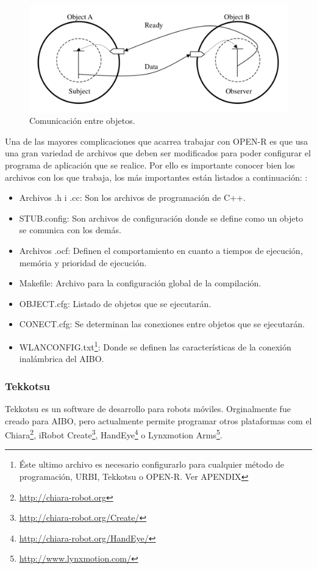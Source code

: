 \documentclass[12pt,a4paper,final,twoside]{book}
\begin{document}
\begin{figure}[h!]
	\centering
    \includegraphics[scale=0.5]{images/ObjectCom.pdf}
	 \caption{Comunicación entre objetos.}
  \label{fig:objectcom}
\end{figure}

Una de las mayores complicaciones que acarrea trabajar con OPEN-R es que usa una gran variedad de archivos que deben ser modificados para poder configurar el programa de aplicación que se realice. Por ello es importante conocer bien los archivos con los que trabaja, los más importantes están listados a continuación: 
:
\begin{itemize}
\item Archivos .h i .cc: Son los archivos de programación de C++.
\item STUB.config: Son archivos de configuración donde se define como un objeto se comunica con los demás.
\item Archivos .ocf: Definen el comportamiento en cuanto a tiempos de ejecución, memória y prioridad de ejecución.
\item Makefile: Archivo para la configuración global de la compilación.
\item OBJECT.cfg: Listado de objetos que se ejecutarán.
\item CONECT.cfg: Se determinan las conexiones entre objetos que se ejecutarán.
\item WLANCONFIG.txt\footnote{Éste ultimo archivo es necesario configurarlo para cualquier método de programación, URBI, Tekkotsu o OPEN-R. Ver APENDIX}: Donde se definen las características de la conexión inalámbrica del AIBO.
\end{itemize}

\subsubsection{Tekkotsu}
Tekkotsu es un software de desarrollo para robots móviles. Orginalmente fue creado para AIBO, pero actualmente permite programar otros plataformas com el Chiara\footnote{\url{http://chiara-robot.org}}, iRobot Create\footnote{\url{http://chiara-robot.org/Create/}}, HandEye\footnote{\url{http://chiara-robot.org/HandEye/}} o Lynxmotion Arms\footnote{\url{http://www.lynxmotion.com/}}.
\end{document}
